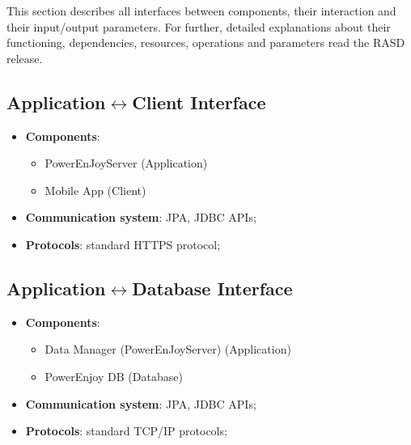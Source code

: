 This section describes all interfaces between components, their interaction and their input/output parameters. For further, detailed explanations about their functioning, dependencies, resources, operations and parameters read the RASD release.

\subsection{Application$\leftrightarrow$Client Interface}
	\begin{itemize}
		\item [] \textbf{Components}:
			\begin{itemize}
				\item PowerEnJoyServer  (Application)
				\item Mobile App (Client)
			\end{itemize}			
		\item [] \textbf{Communication system}: JPA, JDBC APIs;
		\item [] \textbf{Protocols}: standard HTTPS protocol;
	\end{itemize}
	
\subsection{Application$\leftrightarrow$Database  Interface}
	\begin{itemize}
		\item [] \textbf{Components}:
		\begin{itemize}
			\item Data Manager (PowerEnJoyServer) (Application)
			\item PowerEnjoy DB (Database)
		\end{itemize}			
		\item [] \textbf{Communication system}: JPA, JDBC APIs;
		\item [] \textbf{Protocols}: standard TCP/IP protocols;
	\end{itemize}
	
